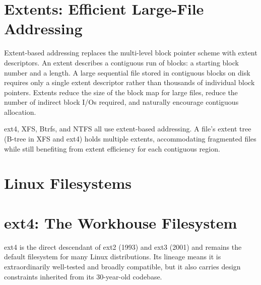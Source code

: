 \section{Extents: Efficient Large-File Addressing}
Extent-based addressing replaces the multi-level block pointer scheme with extent descriptors. An extent describes a contiguous run of blocks: a starting block number and a length. A large sequential file stored in contiguous blocks on disk requires only a single extent descriptor rather than thousands of individual block pointers. Extents reduce the size of the block map for large files, reduce the number of indirect block I/Os required, and naturally encourage contiguous allocation.

ext4, XFS, Btrfs, and NTFS all use extent-based addressing. A file's extent tree (B-tree in XFS and ext4) holds multiple extents, accommodating fragmented files while still benefiting from extent efficiency for each contiguous region.

\section{Linux Filesystems}
\section{ext4: The Workhouse Filesystem}
ext4 is the direct descendant of ext2 (1993) and ext3 (2001) and remains the default filesystem for many Linux distributions. Its lineage means it is extraordinarily well-tested and broadly compatible, but it also carries design constraints inherited from its 30-year-old codebase.

